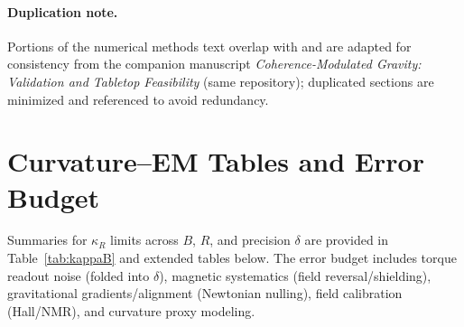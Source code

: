 \documentclass[10pt,twocolumn]{article}
\begin{document}
\paragraph{Duplication note.} Portions of the numerical methods text overlap with and are adapted for consistency from the companion manuscript \emph{Coherence-Modulated Gravity: Validation and Tabletop Feasibility} (same repository); duplicated sections are minimized and referenced to avoid redundancy.

\appendix
\section{Curvature--EM Tables and Error Budget}
Summaries for $\kappa_R$ limits across $B$, $R$, and precision $\delta$ are provided in Table~\ref{tab:kappaB} and extended tables below. The error budget includes torque readout noise (folded into $\delta$), magnetic systematics (field reversal/shielding), gravitational gradients/alignment (Newtonian nulling), field calibration (Hall/NMR), and curvature proxy modeling.

\end{document}

